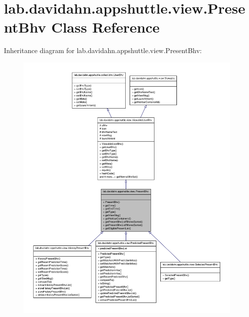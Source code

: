 \hypertarget{classlab_1_1davidahn_1_1appshuttle_1_1view_1_1_present_bhv}{\section{lab.\-davidahn.\-appshuttle.\-view.\-Present\-Bhv \-Class \-Reference}
\label{classlab_1_1davidahn_1_1appshuttle_1_1view_1_1_present_bhv}
}


\-Inheritance diagram for lab.\-davidahn.\-appshuttle.\-view.\-Present\-Bhv\-:
\nopagebreak
\begin{figure}[H]
\begin{center}
\leavevmode
\includegraphics[width=350pt]{classlab_1_1davidahn_1_1appshuttle_1_1view_1_1_present_bhv__inherit__graph}
\end{center}
\end{figure}


